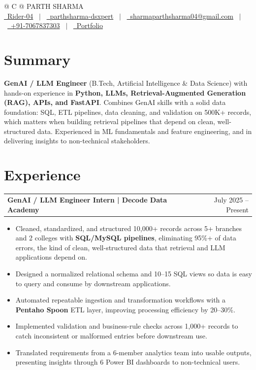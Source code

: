 \documentclass[a4paper,12pt]{article}
\makeatletter
\newenvironment{joblong}[2]
    {
    \begin{tabularx}{\linewidth}{@{}l X r@{}}
    \textbf{#1} & \hfill &  #2 \\[3.75pt]
    \end{tabularx}
    \begin{minipage}[t]{\linewidth}
    \begin{itemize}[nosep,after=\strut, leftmargin=1em, itemsep=3pt,label=--]
    }
    {
    \end{itemize}
    \end{minipage}
    }
\makeatother
\begin{document}
\pagestyle{empty}

\begin{tabularx}{\linewidth}{@{} C @{}}
\Huge{PARTH SHARMA} \\[7.5pt]
\href{https://github.com/Rider-04}{\raisebox{-0.05\height}\faGithub\ Rider-04} \ $|$ \
\href{https://www.linkedin.com/in/parthsharma-dsxpert}{\raisebox{-0.05\height}\faLinkedin\ parthsharma-dsxpert} \ $|$ \
\href{mailto:sharmaparthsharma04@gmail.com}{\raisebox{-0.05\height}\faEnvelope \ sharmaparthsharma04@gmail.com} \ $|$ \
\href{tel:+917067837303}{\raisebox{-0.05\height}\faMobile \ +91-7067837303} \ $|$ \
\href{https://parth-portfolio-virid.vercel.app/}{\raisebox{-0.05\height}\faGlobe \ Portfolio}\end{tabularx}


\section{Summary}
\textbf{GenAI / LLM Engineer} (B.Tech, Artificial Intelligence \& Data Science) with hands-on experience in \textbf{Python, LLMs, Retrieval-Augmented Generation (RAG), APIs, and FastAPI}. Combines GenAI skills with a solid data foundation: SQL, ETL pipelines, data cleaning, and validation on 500K+ records, which matters when building retrieval pipelines that depend on clean, well-structured data. Experienced in ML fundamentals and feature engineering, and in delivering insights to non-technical stakeholders.

\section{Experience}

\begin{joblong}{GenAI / LLM Engineer Intern | Decode Data Academy}{July 2025 -- Present}
\item Cleaned, standardized, and structured 10,000+ records across 5+ branches and 2 colleges with \textbf{SQL/MySQL pipelines}, eliminating 95\%+ of data errors, the kind of clean, well-structured data that retrieval and LLM applications depend on.
\item Designed a normalized relational schema and 10--15 SQL views so data is easy to query and consume by downstream applications.
\item Automated repeatable ingestion and transformation workflows with a \textbf{Pentaho Spoon} ETL layer, improving processing efficiency by 20--30\%.
\item Implemented validation and business-rule checks across 1,000+ records to catch inconsistent or malformed entries before downstream use.
\item Translated requirements from a 6-member analytics team into usable outputs, presenting insights through 6 Power BI dashboards to non-technical users.
\vspace{10pt}
\end{joblong}
\end{document}
